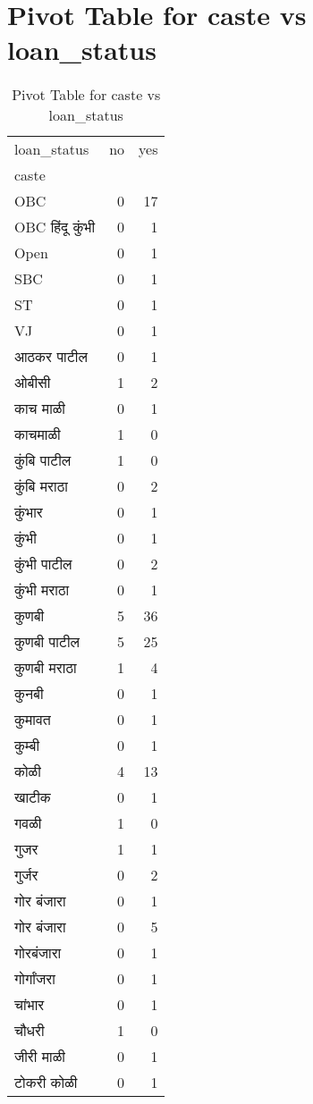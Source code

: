 \documentclass{article}
\begin{document}
\section{Pivot Table for caste vs loan_status}
\begin{table}
\caption{Pivot Table for caste vs loan_status}
\label{tab:caste_loan_status}
\begin{tabular}{lrr}
\toprule
loan_status & no & yes \\
caste &  &  \\
\midrule
OBC & 0 & 17 \\
OBC हिंदू कुंभी & 0 & 1 \\
Open & 0 & 1 \\
SBC & 0 & 1 \\
ST & 0 & 1 \\
VJ & 0 & 1 \\
आठकर पाटील & 0 & 1 \\
ओबीसी & 1 & 2 \\
काच माळी & 0 & 1 \\
काचमाळी & 1 & 0 \\
कुंबि पाटील & 1 & 0 \\
कुंबि मराठा & 0 & 2 \\
कुंभार & 0 & 1 \\
कुंभी & 0 & 1 \\
कुंभी पाटील & 0 & 2 \\
कुंभी मराठा & 0 & 1 \\
कुणबी & 5 & 36 \\
कुणबी पाटील & 5 & 25 \\
कुणबी मराठा & 1 & 4 \\
कुनबी & 0 & 1 \\
कुमावत & 0 & 1 \\
कुम्बी & 0 & 1 \\
कोळी & 4 & 13 \\
खाटीक & 0 & 1 \\
गवळी & 1 & 0 \\
गुजर & 1 & 1 \\
गुर्जर & 0 & 2 \\
गोर  बंजारा & 0 & 1 \\
गोर बंजारा & 0 & 5 \\
गोरबंजारा & 0 & 1 \\
गोर्गांजरा & 0 & 1 \\
चांभार & 0 & 1 \\
चौधरी & 1 & 0 \\
जीरी माळी & 0 & 1 \\
टोकरी कोळी & 0 & 1 \\

\end{tabular}
\end{table}
\end{document}
